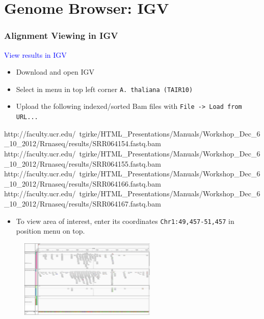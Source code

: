 \documentclass{beamer}
\newenvironment{changemargin}[2]{%
  \begin{list}{}{%
    \setlength{\topsep}{0pt}%
    \setlength{\leftmargin}{#1}%
    \setlength{\rightmargin}{#2}%
    \setlength{\listparindent}{\parindent}%
    \setlength{\itemindent}{\parindent}%
    \setlength{\parsep}{\parskip}%
  }%
  \item[]}{\end{list}}
\begin{document}
\section{Genome Browser: IGV}
\begin{frame}[containsverbatim]  
	\frametitle{Alignment Viewing in IGV}
\vspace{1cm}
\begin{changemargin}{-0.5cm}{-0.5cm}
\tiny
\textcolor{blue}{View results in IGV}
\begin{itemize}
\item Download and open IGV\href{http://www.broadinstitute.org/igv/download}{{}}
\item Select in menu in top left corner \texttt{A. thaliana (TAIR10)}
\item Upload the following indexed/sorted Bam files with \texttt{File -> Load from URL...}
\end{itemize}
\begin{Schunk}
\begin{Sinput}
http://faculty.ucr.edu/~tgirke/HTML_Presentations/Manuals/Workshop_Dec_6_10_2012/Rrnaseq/results/SRR064154.fastq.bam
http://faculty.ucr.edu/~tgirke/HTML_Presentations/Manuals/Workshop_Dec_6_10_2012/Rrnaseq/results/SRR064155.fastq.bam
http://faculty.ucr.edu/~tgirke/HTML_Presentations/Manuals/Workshop_Dec_6_10_2012/Rrnaseq/results/SRR064166.fastq.bam
http://faculty.ucr.edu/~tgirke/HTML_Presentations/Manuals/Workshop_Dec_6_10_2012/Rrnaseq/results/SRR064167.fastq.bam
\end{Sinput}
\end{Schunk}
\begin{itemize}
\item To view area of interest, enter its coordinates \texttt{Chr1:49,457-51,457} in position menu on top.
\end{itemize}
\begin{figure}

        \includegraphics[width=65mm] {./images/igv_peak_3.png} \\
\end{figure}
\end{changemargin}
\end{frame}
\end{document}
